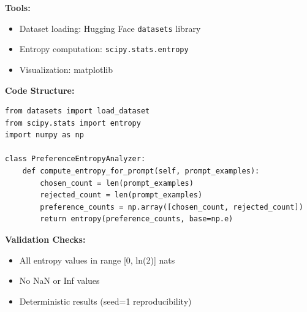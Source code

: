 \textbf{Tools:}
\begin{itemize}
\item Dataset loading: Hugging Face \texttt{datasets} library
\item Entropy computation: \texttt{scipy.stats.entropy}
\item Visualization: matplotlib
\end{itemize}

\textbf{Code Structure:}
\begin{verbatim}
from datasets import load_dataset
from scipy.stats import entropy
import numpy as np

class PreferenceEntropyAnalyzer:
    def compute_entropy_for_prompt(self, prompt_examples):
        chosen_count = len(prompt_examples)
        rejected_count = len(prompt_examples)
        preference_counts = np.array([chosen_count, rejected_count])
        return entropy(preference_counts, base=np.e)
\end{verbatim}

\textbf{Validation Checks:}
\begin{itemize}
\item All entropy values in range [0, ln(2)] nats
\item No NaN or Inf values
\item Deterministic results (seed=1 reproducibility)
\end{itemize}

